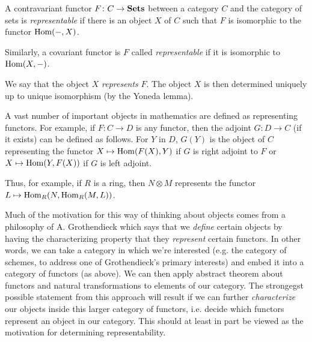 \documentclass{article}
\begin{document}

A contravariant functor $F \colon C \to {\bf Sets}$ between a category $C$ and the category of sets is {\em representable} if there is an object $X$ of $C$ such that $F$ is isomorphic to the functor ${\rm Hom}(-,X)$.

Similarly, a covariant functor is $F$ called {\em representable} if it is isomorphic to ${\rm Hom}(X,-)$.

We say that the object $X$ {\em represents} $F$.  The object $X$ is then determined uniquely up to unique isomorphism (by the Yoneda lemma).

A vast number of important objects in mathematics are defined as representing functors.  For example, if $F\colon C\to D$ is any functor, then the adjoint $G\colon D\to C$ (if it exists) can be defined as follows.  For $Y$ in $D$, $G(Y)$ is the object of $C$ representing the functor $X\mapsto {\rm Hom}(F(X),Y)$ if $G$ is right adjoint to $F$ or $X\mapsto {\rm Hom}(Y,F(X))$ if $G$ is left adjoint.

Thus, for example, if $R$ is a ring, then $N\otimes M$ represents the functor $L\mapsto {\rm Hom}_R(N,{\rm Hom}_R(M,L))$.

Much of the motivation for this way of thinking about objects comes from a philosophy of A. Grothendieck which says that we \emph{define} certain objects by having the characterizing property that they \emph{represent} certain functors.  In other words, we can take a category in which we're interested (e.g. the category of schemes, to address one of Grothendieck's primary interests) and embed it into a category of functors (as above).  We can then apply abstract theorem about functors and natural transformations to elements of our category. The strongegst possible statement from this approach will result if we can further \emph{characterize} our objects inside this larger category of functors, i.e. decide which functors represent an object in our category.  This should at least in part be viewed as the motivation for determining representability.
\end{document}

